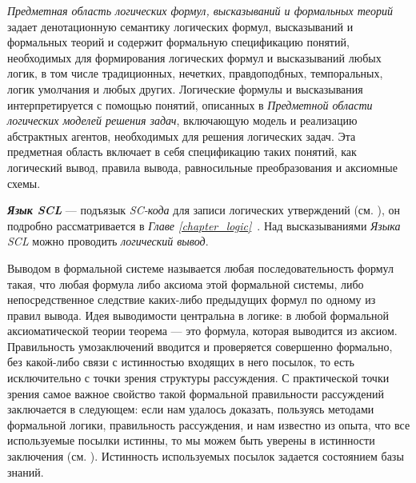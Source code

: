 \textit{Предметная область логических формул, высказываний и формальных теорий} задает денотационную семантику логических формул, высказываний и формальных теорий и содержит формальную спецификацию понятий, необходимых для формирования логических формул и высказываний любых логик, в том числе традиционных, нечетких, правдоподбных, темпоральных, логик умолчания и любых других. Логические формулы и высказывания интерпретируется с помощью понятий, описанных в \textit{Предметной области логических моделей решения задач}, включающую модель и реализацию абстрактных агентов, необходимых для решения логических задач. Эта предметная область включает в себя спецификацию таких понятий, как логический вывод, правила вывода, равносильные преобразования и аксиомные схемы.

\textit{\textbf{Язык SCL}} — подъязык \textit{SC-кода} для записи логических утверждений (см. ), он подробно рассматривается в  \textit{Главе \ref{chapter_logic}~}. Над высказываниями \textit{Языка SCL} можно проводить \textit{логический вывод}.

Выводом в формальной системе называется любая последовательность формул такая, что любая формула либо аксиома этой формальной системы, либо непосредственное следствие каких-либо предыдущих формул по одному из правил вывода. Идея выводимости центральна в логике: в любой формальной аксиоматической теории теорема --- это формула, которая выводится из аксиом. Правильность умозаключений вводится и проверяется совершенно формально, без какой-либо связи с истинностью входящих в него посылок, то есть исключительно с точки зрения структуры рассуждения. С практической точки зрения самое важное свойство такой формальной правильности рассуждений заключается в следующем: если нам удалось доказать, пользуясь методами формальной логики, правильность рассуждения, и нам известно из опыта, что все используемые посылки истинны, то мы можем быть уверены в истинности заключения (см. ). Истинность используемых посылок задается состоянием базы знаний.

